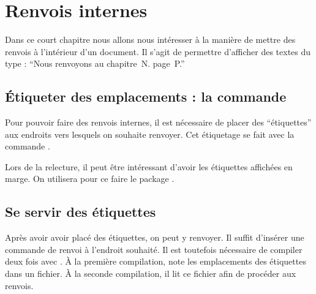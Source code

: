 \chapter{Renvois internes}\label{label}

\begin{prealable}
Dans ce court chapitre nous allons nous intéresser à la manière de mettre des renvois à l'intérieur d'un document.
Il s'agit de permettre d'afficher des textes du type : \enquote{Nous renvoyons au chapitre~N. page~P.}
\end{prealable}

\section{Étiqueter des  emplacements : la commande }

Pour pouvoir faire des renvois internes, il est nécessaire de placer des \enquote{étiquettes} aux endroits vers lesquels on souhaite renvoyer.
Cet étiquetage  se fait avec la commande .

\begin{plusloins}
Lors de la relecture, il peut être intéressant d'avoir les étiquettes affichées en marge. On utilisera pour ce faire le package .
\end{plusloins}

\section{Se servir des étiquettes}

Après avoir avoir placé des étiquettes, on peut y renvoyer. 
Il suffit d'insérer une commande de renvoi à l'endroit souhaité. 
Il est toutefois nécessaire de compiler deux fois avec \XeLaTeX.
À la première compilation,   \XeLaTeX
note les emplacements des étiquettes dans un fichier. À la seconde compilation, il lit ce fichier afin de procéder aux renvois. 


